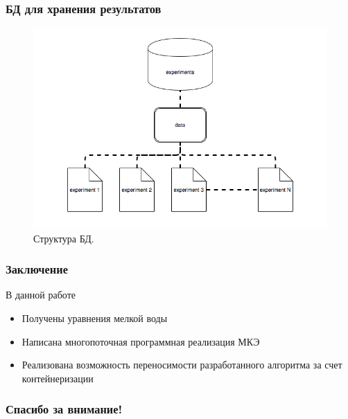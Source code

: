 \documentclass[10pt,utf8,presentation,compress]{beamer}
\begin{document}
\begin{frame}
\frametitle{БД для хранения результатов}
	\begin{figure}[H]
		\centering
		\includegraphics[width=1.0\linewidth]{images/database}
		\caption{Структура БД.}
	\end{figure}
\end{frame}

\begin{frame}
\frametitle{Заключение}
	\begin{block}{\LARGE В данной работе}
		\begin{itemize}
			\item<1-> \large Получены уравнения мелкой воды
			\item<2-> \large Написана многопоточная программная реализация МКЭ
			\item<3-> \large Реализована возможность переносимости разработанного алгоритма за счет контейнеризации
		\end{itemize}
	\end{block}
\end{frame}

\begin{frame}[c]
\begin{center}
\frametitle{\LARGE Спасибо за внимание!}

{\LARGE \inserttitle}

\bigskip\bigskip

{\large \insertauthor} 

\bigskip\bigskip

{\insertinstitute}

\bigskip\bigskip

{\large \insertdate}
\end{center}
\end{frame}
\end{document}

